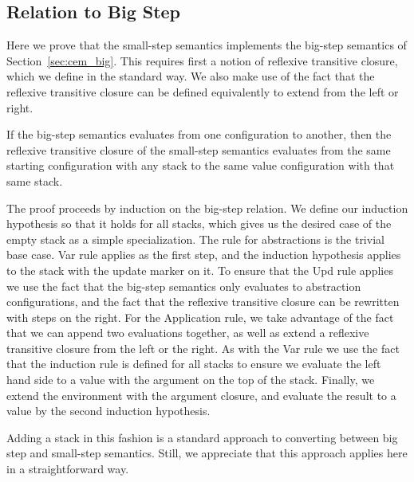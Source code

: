\subsection{Relation to Big Step}
Here we prove that the small-step semantics implements the big-step semantics of
Section~\ref{sec:cem_big}. This requires first a notion of reflexive transitive closure,
which we define in the standard way. We also make use of the fact that the
reflexive transitive closure can be defined equivalently to extend from the left
or right. 

\begin{lemma}
If the big-step semantics evaluates from one configuration to another, then the
reflexive transitive closure of the small-step semantics evaluates from the same
starting configuration with any stack to the same value configuration with that
same stack.
\end{lemma}
\begin{proofoutline}
The proof proceeds by induction on the big-step relation. We define our
induction hypothesis so that it holds for all stacks, which gives us the
desired case of the empty stack as a simple specialization. The rule for
abstractions is the trivial base case. Var rule applies as the first step, and
the induction hypothesis applies to the stack with the update marker on it. To
ensure that the Upd rule applies we use the fact that the big-step semantics
only evaluates to abstraction configurations, and the fact that the reflexive
transitive closure can be rewritten with steps on the right. For the Application
rule, we take advantage of the fact that we can append two evaluations together,
as well as extend a reflexive transitive closure from the left or the right. As
with the Var rule we use the fact that the induction rule is defined for all
stacks to ensure we evaluate the left hand side to a value with the argument on
the top of the stack.  Finally, we extend the environment with the argument
closure, and evaluate the result to a value by the second induction hypothesis.
\end{proofoutline}

Adding a stack in this fashion is a standard approach to converting between big
step and small-step semantics. Still, we appreciate that this approach applies
here in a straightforward way. 
